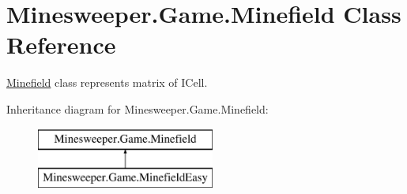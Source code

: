 \hypertarget{class_minesweeper_1_1_game_1_1_minefield}{\section{Minesweeper.\+Game.\+Minefield Class Reference}
\label{class_minesweeper_1_1_game_1_1_minefield}
}


\hyperlink{class_minesweeper_1_1_game_1_1_minefield}{Minefield} class represents matrix of I\+Cell.  


Inheritance diagram for Minesweeper.\+Game.\+Minefield\+:\begin{figure}[H]
\begin{center}
\leavevmode
\includegraphics[height=2.000000cm]{class_minesweeper_1_1_game_1_1_minefield}
\end{center}
\end{figure}
